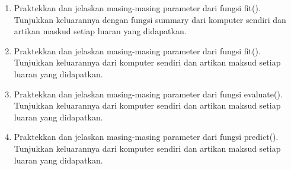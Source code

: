 \begin{enumerate}
\item Praktekkan dan jelaskan masing-masing parameter dari fungsi fit(). Tunjukkan keluarannya dengan fungsi summary dari komputer sendiri dan artikan maskud setiap luaran yang didapatkan.

	\hfill\break
	

\item Praktekkan dan jelaskan masing-masing parameter dari fungsi fit(). Tunjukkan keluarannya dari  komputer sendiri dan artikan maksud setiap luaran yang didapatkan.

	\hfill\break
	
	
\item Praktekkan dan jelaskan masing-masing parameter dari fungsi evaluate(). Tunjukkan keluarannya  dari komputer sendiri dan artikan maksud setiap luaran yang didapatkan.

	\hfill\break
	
	
\item Praktekkan dan jelaskan masing-masing parameter dari fungsi predict(). Tunjukkan keluarannya dari komputer sendiri dan artikan maksud setiap luaran yang didapatkan.

	\hfill\break
	

\end{enumerate}
